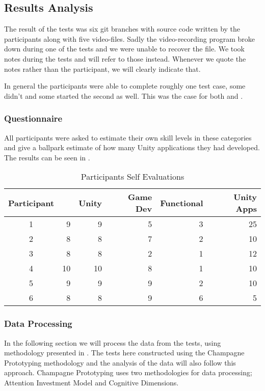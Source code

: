 \subsection{Results Analysis} \label{sec:test-results}
The result of the tests was six git branches with source code written by the participants along with five video-files. Sadly the video-recording program broke down during one of the tests and we were unable to recover the file. We took notes during the tests and will refer to those instead. Whenever we quote the notes rather than the participant, we will clearly indicate that.

In general the participants were able to complete roughly one test case, some didn't and some started the second as well. This was the case for both \fsh and \csh.

\subsubsection{Questionnaire}
All participants were asked to estimate their own skill levels in these categories and give a ballpark estimate of how many Unity applications they had developed. The results can be seen in .

\begin{table}[H]
\begin{tabular}{| c | r | r | r | r | r |}
	\hline
	\textbf{Participant}&\textbf{\csh}&\textbf{Unity}&\textbf{Game Dev}&\textbf{Functional}&\textbf{Unity Apps} \\ \hline
	1 & 9 & 9 & 5 & 3 & 25 \\ \hline
	2 & 8 & 8 & 7 & 2 & 10 \\ \hline
	3 & 8 & 8 & 2 & 1 & 12 \\ \hline
	4 & 10 & 10 & 8 & 1 & 10 \\ \hline
	5 & 9 & 9 & 9 & 2 & 10 \\ \hline
	6 & 8 & 8 & 9 & 6 & 5 \\ \hline
\end{tabular}
\caption{Participants Self Evaluations}
\label{tab:participant-scores}
\end{table}

\newcommand{\mn}{\newmoon}
\newcommand{\mns}{\fullmoon}

\subsubsection{Data Processing}
In the following section we will process the data from the tests, using methodology presented in . The tests here constructed using the Champagne Prototyping methodology and the analysis of the data will also follow this approach. Champagne Prototyping uses two methodologies for data processing; Attention Investment Model and Cognitive Dimensions.


